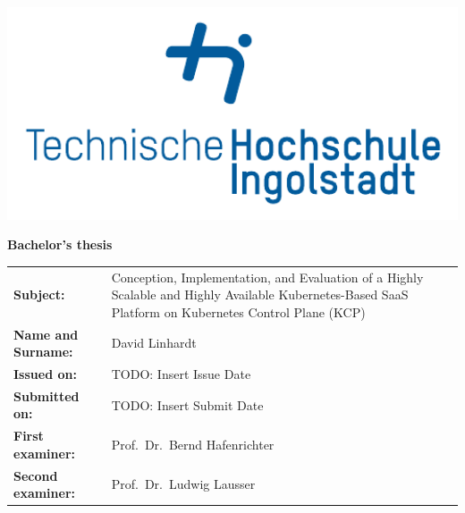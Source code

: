 \documentclass[11pt, a4paper, oneside, draft]{scrartcl}
\title{\thesistitle}
\author{David Linhardt}
\date{\today}
\newcommand{\thesistitle}{Conception, Implementation, and Evaluation of a Highly Scalable and Highly Available Kubernetes-Based SaaS Platform on Kubernetes Control Plane (KCP)}
\begin{document}

    \begin{titlepage}
        \thispagestyle{empty}

        \hspace*{-1.5cm}
        \noindent
        \hfill
        \begin{minipage}{0.3\textwidth}
            \raggedleft\
            \hspace*{1cm}
            \includegraphics[width=1\textwidth]{images/thi_logo.pdf}
        \end{minipage}

        \vspace{1cm}

        \hrulefill

        \vspace{4cm}

        \noindent

        \begin{center}
            \LARGE\textbf{Bachelor's thesis}
        \end{center}

        \vspace{1cm}

        \begin{tabularx}{\textwidth}{@{}lX@{}}
            \textbf{Subject:} & \thesistitle \\[2cm]
            \textbf{Name and Surname:} & David Linhardt \\[2cm]     
            \textbf{Issued on:} & TODO: Insert Issue Date \\[0.5cm]           
            \textbf{Submitted on:} & TODO: Insert Submit Date \\[2cm]           
            \textbf{First examiner:} & Prof.\ Dr.\ Bernd Hafenrichter \\[0.5cm]      
            \textbf{Second examiner:} & Prof.\ Dr.\ Ludwig Lausser \\
        \end{tabularx}


\end{titlepage}
\end{document}
